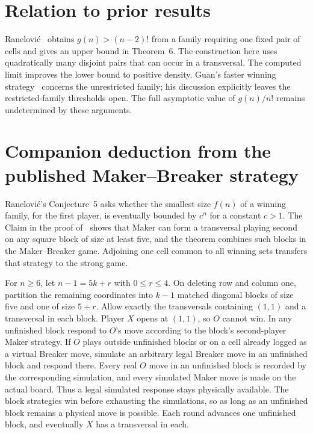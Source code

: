 \documentclass[11pt]{amsart}
\begin{document}
\section{Relation to prior results}
Ran{\dj}elovi\'c~\cite[\S3, p.~13]{R} obtains \(g(n)>(n-2)!\) from a family requiring one fixed pair of cells and gives an upper bound in Theorem~6. The construction here uses quadratically many disjoint pairs that can occur in a transversal. The computed limit improves the lower bound to positive density. Guan's faster winning strategy~\cite{G} concerns the unrestricted family; his discussion explicitly leaves the restricted-family thresholds open. The full asymptotic value of \(g(n)/n!\) remains undetermined by these arguments.

\section*{Companion deduction from the published Maker--Breaker strategy}
Ran{\dj}elovi\'c's Conjecture~5 asks whether the smallest size \(f(n)\) of a winning family, for the first player, is eventually bounded by \(c^n\) for a constant \(c>1\). The Claim in the proof of~\cite[Theorem~4]{R} shows that Maker can form a transversal playing second on any square block of size at least five, and the theorem combines such blocks in the Maker--Breaker game. Adjoining one cell common to all winning sets transfers that strategy to the strong game.

For \(n\ge6\), let \(n-1=5k+r\) with \(0\le r\le4\). On deleting row and column one, partition the remaining coordinates into \(k-1\) matched diagonal blocks of size five and one of size \(5+r\). Allow exactly the transversals containing \((1,1)\) and a transversal in each block. Player \(X\) opens at \((1,1)\), so \(O\) cannot win. In any unfinished block respond to \(O\)'s move according to the block's second-player Maker strategy. If \(O\) plays outside unfinished blocks or on a cell already logged as a virtual Breaker move, simulate an arbitrary legal Breaker move in an unfinished block and respond there. Every real \(O\) move in an unfinished block is recorded by the corresponding simulation, and every simulated Maker move is made on the actual board. Thus a legal simulated response stays physically available. The block strategies win before exhausting the simulations, so as long as an unfinished block remains a physical move is possible. Each round advances one unfinished block, and eventually \(X\) has a transversal in each.
\end{document}

